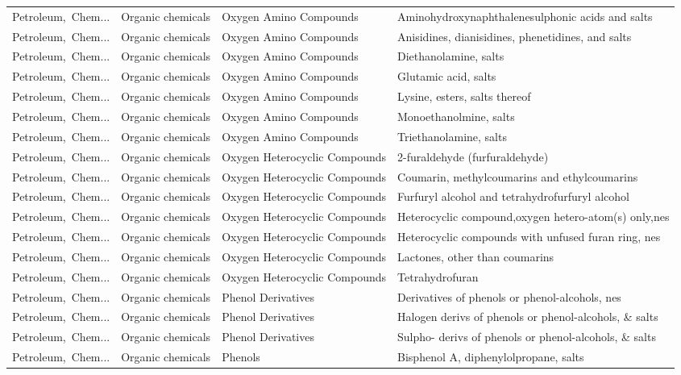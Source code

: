 \begin{appendices}
\begin{xltabular}{\textwidth}{|p{0.10\textwidth}|p{0.25\textwidth}|p{0.24\textwidth}|p{0.31\textwidth}|}
Petroleum,\ Chem... & Organic chemicals & Oxygen Amino Compounds & Aminohydroxynaphthalenesulphonic acids and salts \\
Petroleum,\ Chem... & Organic chemicals & Oxygen Amino Compounds & Anisidines, dianisidines, phenetidines, and salts \\
Petroleum,\ Chem... & Organic chemicals & Oxygen Amino Compounds & Diethanolamine, salts \\
Petroleum,\ Chem... & Organic chemicals & Oxygen Amino Compounds & Glutamic acid, salts \\
Petroleum,\ Chem... & Organic chemicals & Oxygen Amino Compounds & Lysine, esters, salts thereof \\
Petroleum,\ Chem... & Organic chemicals & Oxygen Amino Compounds & Monoethanolmine, salts \\
Petroleum,\ Chem... & Organic chemicals & Oxygen Amino Compounds & Triethanolamine, salts \\
Petroleum,\ Chem... & Organic chemicals & Oxygen Heterocyclic Compounds & 2-furaldehyde (furfuraldehyde) \\
Petroleum,\ Chem... & Organic chemicals & Oxygen Heterocyclic Compounds & Coumarin, methylcoumarins and ethylcoumarins \\
Petroleum,\ Chem... & Organic chemicals & Oxygen Heterocyclic Compounds & Furfuryl alcohol and tetrahydrofurfuryl alcohol \\
Petroleum,\ Chem... & Organic chemicals & Oxygen Heterocyclic Compounds & Heterocyclic compound,oxygen hetero-atom(s) only,nes \\
Petroleum,\ Chem... & Organic chemicals & Oxygen Heterocyclic Compounds & Heterocyclic compounds with unfused furan ring, nes \\
Petroleum,\ Chem... & Organic chemicals & Oxygen Heterocyclic Compounds & Lactones, other than coumarins \\
Petroleum,\ Chem... & Organic chemicals & Oxygen Heterocyclic Compounds & Tetrahydrofuran \\
Petroleum,\ Chem... & Organic chemicals & Phenol Derivatives & Derivatives of phenols or phenol-alcohols, nes \\
Petroleum,\ Chem... & Organic chemicals & Phenol Derivatives & Halogen derivs of phenols or phenol-alcohols, \& salts \\
Petroleum,\ Chem... & Organic chemicals & Phenol Derivatives & Sulpho- derivs of phenols or phenol-alcohols, \& salts \\
Petroleum,\ Chem... & Organic chemicals & Phenols & Bisphenol A, diphenylolpropane, salts \\

\end{xltabular}
\end{appendices}
